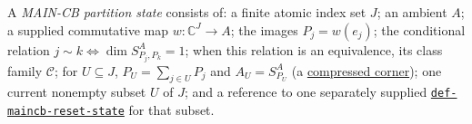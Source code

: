 \hypertarget{def:maincb-partition-state}{}%
\begin{definition}\label{def:maincb-partition-state}
A \emph{MAIN-CB partition state} consists of: a
finite atomic index set $J$; an ambient $A$; a supplied commutative map
$w:\mathbb C^J\to A$; the images $P_j=w(e_j)$; the conditional relation
$j\sim k\iff\dim S^A_{P_j,P_k}=1$; when this relation is an equivalence, its
class family $\mathcal C$; for $U\subseteq J$, $P_U=\sum_{j\in U}P_j$ and
$A_U=S^A_{P_U}$ (a \hyperref[def:compressed-corner]{compressed corner}); one current
nonempty subset $U$ of $J$; and a reference to one separately supplied
\hyperref[def:maincb-reset-state]{\texttt{def-\allowbreak{}maincb-\allowbreak{}reset-\allowbreak{}state}} for that subset.
\end{definition}

